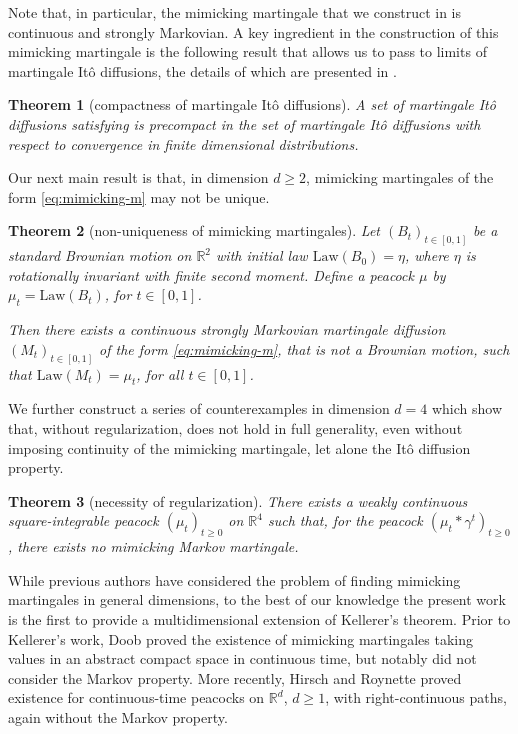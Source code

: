 \documentclass[12pt,oneside]{amsart}
\newtheorem{theorem}{Theorem}[section]
\theoremstyle{definition}
\newcommand{\Law}{\mathrm{Law}}
\newcommand{\R}{\mathbb R}
\def\R{{\mathbb R}}
\numberwithin{equation}{section}
\begin{document}
Note that, in particular, the mimicking martingale that we construct in  is continuous and strongly Markovian.
A key ingredient in the construction of this mimicking martingale is the following result that allows us to pass to limits of martingale It\^o diffusions, the details of which are presented in .


\begin{theorem}[compactness of martingale It\^o diffusions]\label{thm:compactness}
	A set of martingale It\^o diffusions satisfying  is precompact in the set of martingale It\^o diffusions with respect to convergence in finite dimensional distributions.
\end{theorem}

Our next main result is that, in dimension $d \geq 2$, mimicking martingales of the form \eqref{eq:mimicking-m} may not be unique.

\begin{theorem}[non-uniqueness of mimicking martingales]\label{thm:non-uniqueness}
	Let $(B_t)_{t \in [0, 1]}$ be a standard Brownian motion on $\R^2$ with initial law $\Law(B_0) = \eta$, where $\eta$ is rotationally invariant with finite second moment. Define a peacock $\mu$ by $\mu_t = \Law(B_t)$, for $t \in [0, 1]$.
	
	Then there exists a continuous strongly Markovian martingale diffusion $(M_t)_{t \in [0, 1]}$ of the form \eqref{eq:mimicking-m}, that is not a Brownian motion, such that $\Law(M_t) = \mu_t$, for all $t \in [0, 1]$.
\end{theorem}

We further construct a series of counterexamples in dimension $d = 4$ which show that, without regularization,  does not hold in full generality, even without imposing continuity of the mimicking martingale, let alone the It\^o diffusion property.

\begin{theorem}[necessity of regularization]\label{thm:necessity}
	There exists a weakly continuous square-integrable peacock $(\mu_t)_{t \geq 0}$ on $\R^4$ such that, for the peacock $(\mu_t \ast \gamma^t)_{t \geq 0}$, there exists no mimicking Markov martingale.
\end{theorem}

While previous authors have considered the problem of finding mimicking martingales in general dimensions, to the best of our knowledge the present work is the first to provide a multidimensional extension of Kellerer's theorem. Prior to Kellerer's work, Doob \cite{Do68} proved the existence of mimicking martingales taking values in an abstract compact space in continuous time, but notably did not consider the Markov property. More recently, Hirsch and Roynette \cite{HiRo13} proved existence for continuous-time peacocks on $\R^d$, $d \geq 1$, with right-continuous paths, again without the Markov property.
\end{document}
